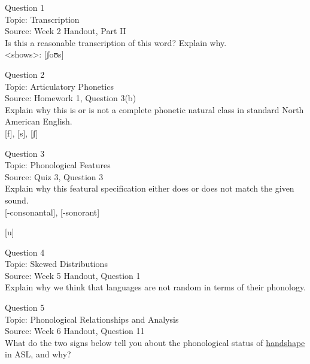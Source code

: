 \documentclass[12pt]{article}
\begin{document}
{\large Question 1}\\

Topic: Transcription\\
Source: Week 2 Handout, Part II\\

Is this a reasonable transcription of this word? Explain why.\\

<shows>: {[ʃoʊs]}


\newpage

{\large Question 2}\\

Topic: Articulatory Phonetics\\
Source: Homework 1, Question 3(b)\\

Explain why this is or is not a complete phonetic natural class in standard North American English.\\

{[f]}, {[s]}, {[ʃ]}


\newpage

{\large Question 3}\\

Topic: Phonological Features\\
Source: Quiz 3, Question 3\\

Explain why this featural specification either does or does not match the given sound.\\

{[-consonantal]}, {[-sonorant]}

{[u]}


\newpage

{\large Question 4}\\

Topic: Skewed Distributions\\
Source: Week 5 Handout, Question 1\\

Explain why we think that languages are not random in terms of their phonology.\\


\newpage

{\large Question 5}\\

Topic: Phonological Relationships and Analysis\\
Source: Week 6 Handout, Question 11\\

What do the two signs below tell you about the phonological status of \underline{handshape} in ASL, and why?\\
\end{document}
